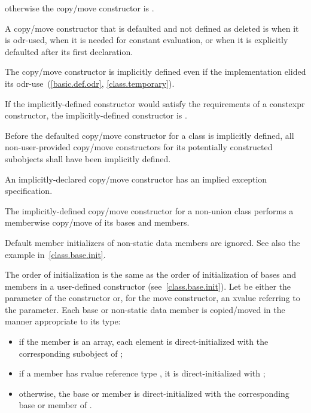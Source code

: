 %
otherwise the copy/move constructor is
.

\pnum
{}%
%
A copy/move constructor
that is defaulted and not defined as deleted
is
when it is odr-used,
when it is needed for constant evaluation, or
when it is explicitly defaulted after its first declaration.
\begin{note}
The copy/move constructor is implicitly defined even if the implementation elided
its odr-use~(\ref{basic.def.odr}, \ref{class.temporary}).
\end{note}
If the implicitly-defined constructor would satisfy the requirements of a
constexpr constructor, the implicitly-defined
constructor is .

\pnum
Before the defaulted copy/move constructor for a class is
implicitly defined,
all non-user-provided copy/move constructors for its
potentially constructed subobjects
shall have been implicitly defined.
\begin{note}
An implicitly-declared copy/move constructor has an
implied exception specification.
\end{note}

\pnum
The implicitly-defined copy/move constructor for a non-union class
performs a memberwise copy/move of its bases and members.
\begin{note} Default member initializers of non-static data members are ignored. See also the example in~\ref{class.base.init}. \end{note}
The order of initialization is the same as the order of initialization of bases
and members in a user-defined constructor (see~\ref{class.base.init}).
Let  be either the parameter of the constructor or, for the move constructor, an
xvalue referring to the parameter.
Each base or non-static data member
is copied/moved in the manner appropriate to its type:

\begin{itemize}
\item
if the member is an array, each element is
direct-initialized with the corresponding subobject of ;

\item
if a member  has rvalue reference type , it is direct-initialized with
;

\item
otherwise, the base or member is direct-initialized with the corresponding base or member of .
\end{itemize}

